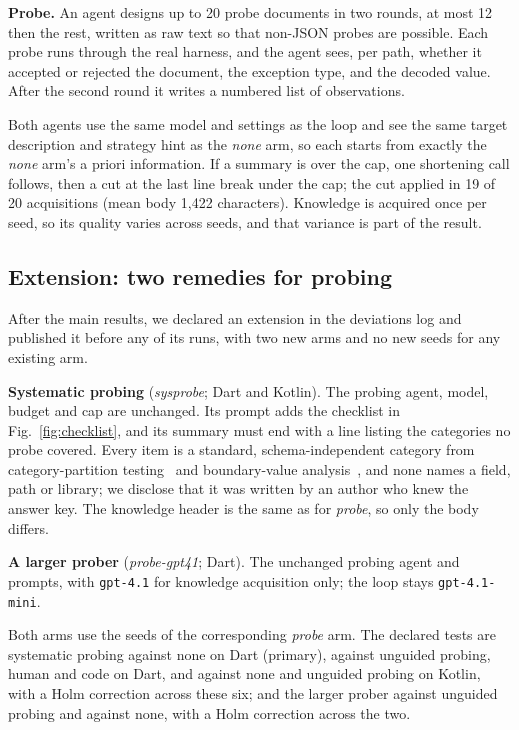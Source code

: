 \textbf{Probe.} An agent designs up to 20 probe documents in two rounds, at
most 12 then the rest, written as raw text so that non-JSON probes are
possible. Each probe runs through the real harness, and the agent sees, per
path, whether it accepted or rejected the document, the exception type, and
the decoded value. After the second round it writes a numbered list of
observations.

Both agents use the same model and settings as the loop and see the same
target description and strategy hint as the \emph{none} arm, so each starts
from exactly the \emph{none} arm's a priori information. If a summary is
over the cap, one shortening call follows, then a cut at the last line break
under the cap; the cut applied in 19 of 20 acquisitions (mean body 1{,}422
characters). Knowledge is acquired once per seed, so its quality varies
across seeds, and that variance is part of the result.

\subsection{Extension: two remedies for probing}
\label{sec:extension}

After the main results, we declared an extension in the deviations log and
published it before any of its runs, with two new arms and no new seeds for
any existing arm.

\textbf{Systematic probing} (\emph{sysprobe}; Dart and Kotlin). The probing
agent, model, budget and cap are unchanged. Its prompt adds the checklist in
Fig.~\ref{fig:checklist}, and its summary must end with a line listing the
categories no probe covered. Every item is a standard, schema-independent
category from category-partition testing~\cite{ostrand1988category} and
boundary-value analysis~\cite{myers2011art}, and
none names a field, path or library; we disclose that it was written by an
author who knew the answer key. The knowledge header is the same as for
\emph{probe}, so only the body differs.

\textbf{A larger prober} (\emph{probe-gpt41}; Dart). The unchanged probing
agent and prompts, with \texttt{gpt-4.1} for knowledge acquisition only; the
loop stays \texttt{gpt-4.1-mini}.

Both arms use the seeds of the corresponding \emph{probe} arm. The declared
tests are systematic probing against none on Dart (primary), against unguided
probing, human and code on Dart, and against none and unguided probing on
Kotlin, with a Holm correction across these six; and the larger prober
against unguided probing and against none, with a Holm correction across
the two.

